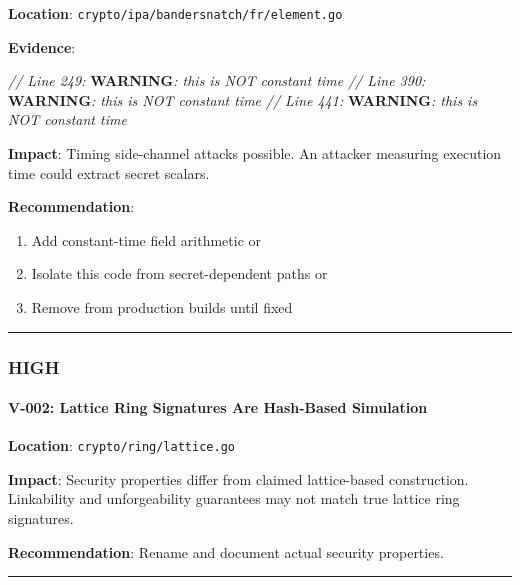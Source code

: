 \documentclass[
]{article}
\newenvironment{Shaded}{}{}
\newcommand{\AlertTok}[1]{\textcolor[rgb]{1.00,0.00,0.00}{\textbf{#1}}}
\newcommand{\CommentTok}[1]{\textcolor[rgb]{0.38,0.63,0.69}{\textit{#1}}}
\providecommand{\tightlist}{%
  \setlength{\itemsep}{0pt}\setlength{\parskip}{0pt}}
\begin{document}
\textbf{Location}: \texttt{crypto/ipa/bandersnatch/fr/element.go}

\textbf{Evidence}:

\begin{Shaded}
\begin{Highlighting}[]
\CommentTok{// Line 249: }\AlertTok{WARNING}\CommentTok{: this is NOT constant time}
\CommentTok{// Line 390: }\AlertTok{WARNING}\CommentTok{: this is NOT constant time  }
\CommentTok{// Line 441: }\AlertTok{WARNING}\CommentTok{: this is NOT constant time}
\end{Highlighting}
\end{Shaded}

\textbf{Impact}: Timing side-channel attacks possible. An attacker
measuring execution time could extract secret scalars.

\textbf{Recommendation}:

\begin{enumerate}
\def\labelenumi{\arabic{enumi}.}
\tightlist
\item
  Add constant-time field arithmetic or
\item
  Isolate this code from secret-dependent paths or
\item
  Remove from production builds until fixed
\end{enumerate}

\begin{center}\rule{0.5\linewidth}{0.5pt}\end{center}

\subsubsection{HIGH}\label{high}

\paragraph{V-002: Lattice Ring Signatures Are Hash-Based
Simulation}\label{v-002-lattice-ring-signatures-are-hash-based-simulation}

\textbf{Location}: \texttt{crypto/ring/lattice.go}

\textbf{Impact}: Security properties differ from claimed lattice-based
construction. Linkability and unforgeability guarantees may not match
true lattice ring signatures.

\textbf{Recommendation}: Rename and document actual security properties.

\begin{center}\rule{0.5\linewidth}{0.5pt}\end{center}
\end{document}
